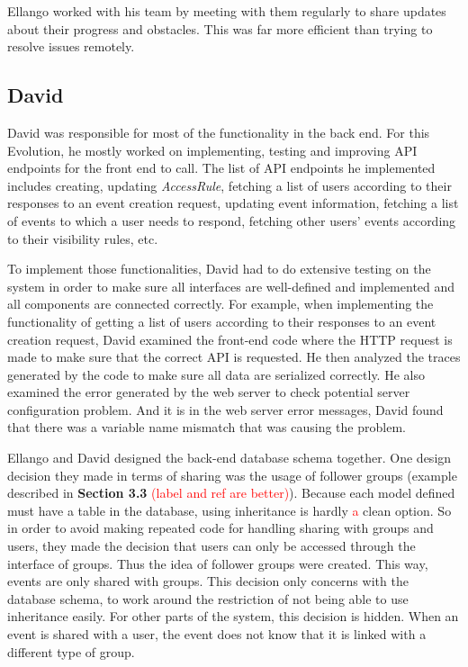 \documentclass[a4paper]{article}
\newcommand{\comment}[1]{\textcolor{red}{#1}}
\begin{document}
Ellango worked with his team by meeting with them regularly to share updates about their progress and obstacles. This was far more efficient than trying to resolve issues remotely.

\subsection{David}
David was responsible for most of the functionality in the back end. For this Evolution, he mostly worked on implementing, testing and improving API endpoints for the front end to call. The list of API endpoints he implemented includes creating, updating \emph{AccessRule}, fetching a list of users according to their responses to an event creation request, updating event information, fetching a list of events to which a user needs to respond, fetching other users' events according to their visibility rules, etc.

To implement those functionalities, David had to do extensive testing on the system in order to make sure all interfaces are well-defined and implemented and all components are connected correctly. For example, when implementing the functionality of getting a list of users according to their responses to an event creation request, David examined the front-end code where the HTTP request is made to make sure that the correct API is requested. He then analyzed the traces generated by the code to make sure all data are serialized correctly. He also examined the error generated by the web server to check potential server configuration problem. And it is in the web server error messages, David found that there was a variable name mismatch that was causing the problem. 

Ellango and David designed the back-end database schema together. One design decision they made in terms of sharing was the usage of follower groups (example described in \textbf{Section 3.3} \comment{(label and ref are better)}). Because each model defined must have a table in the database, using inheritance is hardly \comment{a} clean option. So in order to avoid making repeated code for handling sharing with groups and users, they made the decision that users can only be accessed through the interface of groups. Thus the idea of follower groups were created. This way, events are only shared with groups. This decision only concerns with the database schema, to work around the restriction of not being able to use inheritance easily. For other parts of the system, this decision is hidden. When an event is shared with a user, the event does not know that it is linked with a different type of group.
\end{document}

